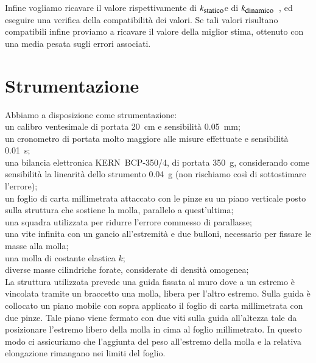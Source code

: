 \documentclass[italian, a4paper, 10pt, twocolumn]{../../style/lab_unige}
\newcommand{\ks}{$k_{\text{\small statico}}$\space}
\newcommand{\kd}{$k_{\text{\small dinamico}}$\space}
\begin{document}
    Infine vogliamo ricavare il valore rispettivamente di \ks e di \kd~, ed
    eseguire una verifica della compatibilità dei valori. Se tali valori risultano compatibili infine proviamo a 
    ricavare il valore della miglior stima, ottenuto con una media pesata sugli errori associati.

    \section{Strumentazione}
    \label{section:strument}
    Abbiamo a disposizione come strumentazione:\\
    un calibro ventesimale di portata 20~cm e sensibilità 0.05~mm;\\
    un cronometro di portata molto maggiore alle misure effettuate e sensibilità 0.01~s;\\
    una bilancia elettronica KERN~BCP-350/4, di portata 350~g, considerando come sensibilità la linearità dello 
    strumento 0.04~g (non rischiamo così di sottostimare l'errore);\\
    un foglio di carta millimetrata attaccato con le pinze su un piano verticale posto sulla struttura che sostiene
    la molla, parallelo a quest'ultima;\\
    una squadra utilizzata per ridurre l'errore commesso di parallasse;\\
    una vite infinita con un gancio all'estremità e due bulloni, necessario per fissare le masse alla molla;\\
    una molla di costante elastica $k$;\\
    diverse masse cilindriche forate, considerate di densità omogenea;\\

    La struttura utilizzata prevede una guida fissata al muro dove a un estremo è vincolata tramite un braccetto 
    una molla, libera per l'altro estremo. Sulla guida è collocato un piano mobile con sopra applicato il foglio 
    di carta millimetrata con due pinze. Tale piano viene fermato con due viti sulla guida all'altezza tale da
    posizionare l'estremo libero della molla in cima al foglio millimetrato. In questo modo ci assicuriamo che 
    l'aggiunta del peso all'estremo della molla e la relativa elongazione rimangano nei limiti del foglio.
\end{document}
